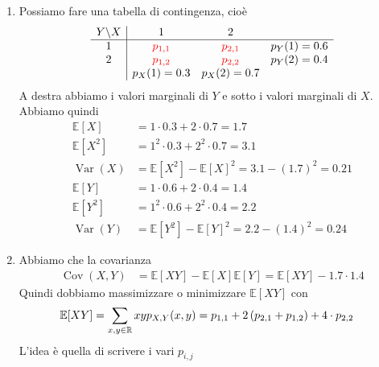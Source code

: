 \documentclass[a4paper]{article}
\begin{document}
\begin{snippetsolution}{}
    \begin{enumerate}
        \item Possiamo fare una tabella di contingenza, cioè
            \[
                \begin{array}{c|ccc}
                    Y \backslash X & 1 & 2 & \\
                    \hline
                    1 & \textcolor{red}{p_{1,1}} & \textcolor{red}{p_{2,1}} & p_Y(1)=0.6 \\
                    2 & \textcolor{red}{p_{1,2}} & \textcolor{red}{p_{2,2}} & p_Y(2)=0.4 \\
                    & p_X(1) = 0.3 & p_X(2) = 0.7
                \end{array}
            \]
            A destra abbiamo i valori marginali di \(Y\) e sotto i valori marginali di \(X\).
            Abbiamo quindi
            \begin{align*}
                \mathbb E[X] &= 1 \cdot 0.3 + 2 \cdot 0.7 = 1.7 \\
                \mathbb E[X^2] &= 1^2 \cdot 0.3 + 2^2 \cdot 0.7 = 3.1 \\
                \operatorname{Var}(X) &= \mathbb E[X^2] - \mathbb E[X]^2
                = 3.1 - (1.7)^2 = 0.21 \\
                \mathbb E[Y] &= 1 \cdot 0.6 + 2 \cdot 0.4 = 1.4 \\
                \mathbb E[Y^2] &= 1^2 \cdot 0.6 + 2^2 \cdot 0.4 = 2.2 \\
                \operatorname{Var}(Y) &= \mathbb E[Y^2] - \mathbb E[Y]^2
                = 2.2 - (1.4)^2 = 0.24
            \end{align*}
        \item Abbiamo che la covarianza
            \begin{align*}
                \operatorname{Cov}(X,Y) &= \mathbb E[XY] - \mathbb E[X] \mathbb E[Y]
                = \mathbb E[XY] - 1.7 \cdot 1.4
            \end{align*}
            Quindi dobbiamo massimizzare o minimizzare
            \(\mathbb E[XY]\) con
            \begin{align*}
                \mathbb E[XY]
                &= \sum_{x,y \in \mathbb{R}} xyp_{X,Y}(x,y)
                = p_{1,1} + 2\left(p_{2,1} + p_{1,2}\right)
                + 4 \cdot p_{2,2}
            \end{align*}
            L'idea è quella di scrivere i vari \(p_{i,j}\)

\end{enumerate}
\end{snippetsolution}
\end{document}
